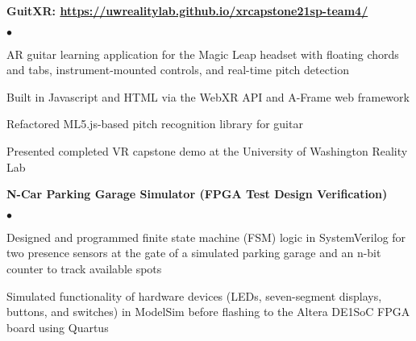 \documentclass[margin,line]{res}
\newenvironment{list2}{
  \begin{list}{$\bullet$}{%
      \setlength{\itemsep}{0in}
      \setlength{\parsep}{0in} \setlength{\parskip}{0in}
      \setlength{\topsep}{0in} \setlength{\partopsep}{0in} 
      \setlength{\leftmargin}{0.2in}}}{\end{list}}
\begin{document}
\begin{resume}
{\bf GuitXR: \url{https://uwrealitylab.github.io/xrcapstone21sp-team4/}} %
\begin{list2}
\item AR guitar learning application for the Magic Leap headset with floating chords and tabs, instrument-mounted controls, and real-time pitch detection
\item Built in Javascript and HTML via the WebXR API and A-Frame web framework
\item Refactored ML5.js-based pitch recognition library for guitar
\item Presented completed VR capstone demo at the University of Washington Reality Lab
\end{list2}

{\bf N-Car Parking Garage Simulator (FPGA Test Design Verification)}
\begin{list2}
\item Designed and programmed finite state machine (FSM) logic in SystemVerilog for two presence sensors at the gate of a simulated parking garage and an n-bit counter to track available spots
\item Simulated functionality of hardware devices (LEDs, seven-segment displays, buttons, and switches) in ModelSim before flashing to the Altera DE1{\textunderscore}SoC FPGA board using Quartus
\end{list2}



\end{resume}
\end{document}
